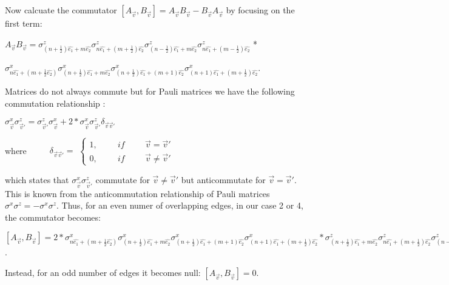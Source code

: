 \documentclass{Configuration_Files/PoliMi3i_thesis}
\begin{document}
Now calcuate the commutator $[A_{\vec{v}},B_{\vec{v}}] = A_{\vec{v}}B_{\vec{v}} - B_{\vec{v}}A_{\vec{v}}$ by focusing on the first term: \newline

\begin{center}
	
	$ A_{\vec{v}}B_{\vec{v}} =
	\sigma^z_{(n+\frac{1}{2})\hat{e_1} + m\hat{e_2}} \sigma^z_{n\hat{e_1}+(m+\frac{1}{2})\hat{e_2}} \sigma^z_{(n-\frac{1}{2})\hat{e_1} + m\hat{e_2}} \sigma^z_{n\hat{e_1}+(m-\frac{1}{2})\hat{e_2}} $ *
	
	$\sigma^x_{n\hat{e_1} + (m+\frac{1}{2}\hat{e_2})} \sigma^x_{(n+ \frac{1}{2})\hat{e_1} + m\hat{e_2}} \sigma^x_{(n+ \frac{1}{2})\hat{e_1} + (m + 1)\hat{e_2}} \sigma^x_{(n+ 1)\hat{e_1} + (m + \frac{1}{2})\hat{e_2}}$. \newline
	
\end{center}


Matrices do not always commute but for Pauli matrices we have the following commutation relationship :
\newline

\begin{center}
	$\sigma^x_{\vec{v}}\sigma^z_{\vec{v}'} = \sigma^z_{\vec{v}'} \sigma^x_{\vec{v}} + 2 * \sigma^x_{\vec{v}}\sigma^z_{\vec{v}'} \delta_{\vec{v} \vec{v}'}$\newline
\end{center}

where $\hspace{1cm} \delta_{\vec{v} \vec{v}'} =$
$\begin{cases}
	1, \hspace{1cm} if \hspace{1cm}  \vec{v} = \vec{v}'\\
	0, \hspace{1cm} if \hspace{1cm} \vec{v} \neq \vec{v}'
\end{cases}$\newline

which states that 	$\sigma^x_{\vec{v}}\sigma^z_{\vec{v}'}$ commutate for $\vec{v} \neq \vec{v}'$   but anticommutate for $\vec{v} = \vec{v}'$. This is known from the anticommutation relationship of Pauli matrices $\sigma^x \sigma^z = - \sigma^x \sigma^z$. Thus, for an even numer of overlapping edges, in our case 2 or 4, the commutator becomes:\newline

\begin{center}
	
	$[A_{\vec{v}},B_{\vec{v}}] = 2 *
	\sigma^x_{n\hat{e_1} + (m+\frac{1}{2}\hat{e_2})} \sigma^x_{(n+ \frac{1}{2})\hat{e_1} + m\hat{e_2}} \sigma^x_{(n+ \frac{1}{2})\hat{e_1} + (m + 1)\hat{e_2}} \sigma^x_{(n+ 1)\hat{e_1} + (m + \frac{1}{2})\hat{e_2}}*
	\sigma^z_{(n+\frac{1}{2})\hat{e_1} + m\hat{e_2}} \sigma^z_{n\hat{e_1}+(m+\frac{1}{2})\hat{e_2}} \sigma^z_{(n-\frac{1}{2})\hat{e_1} + m\hat{e_2}} \sigma^z_{n\hat{e_1}+(m-\frac{1}{2})\hat{e_2}} $. \newline

\end{center}
Instead, for an odd number of edges it becomes null: $[A_{\vec{v}},B_{\vec{v}}]=0$.
\end{document}
